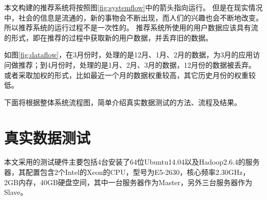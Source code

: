 \begin{center}
\def\sysleft{
    \node at (0,0) [rectangle,draw] {Data from \textbf{Feb}};
    \node at (0,1) [rectangle,draw] {Data from \textbf{Jan}};
    \node at (0,2) [rectangle,draw] {Data from \textbf{Dec}};
    \node at (0,5) [rectangle,draw] {Data from \textbf{Nov}};
    \node at (0,3) [align=center] {\textbf{Data proccessing}\\
             \textbf{in Recommend system}};
    \draw (-2.2,-1) rectangle (2.2,4);
}
\def\sysright{
    \node at (0,0) [rectangle,draw] {Data from \textbf{Mar}};
    \node at (0,1) [rectangle,draw] {Data from \textbf{Feb}};
    \node at (0,2) [rectangle,draw] {Data from \textbf{Jan}};
    \node at (0,5) [rectangle,draw] {Data from \textbf{Dec}};
    \node at (0,3) [align=center] {\textbf{Data proccessing}\\
             \textbf{in Recommend system}};
    \draw (-2.2,-1) rectangle (2.2,4);
}
\label{fig:dataflow}
\end{center}

本文构建的推荐系统将按照图\ref{fig:systemflow}中的箭头指向运行。
但是在现实情况中，社会的信息是流通的，新的事物会不断出现，而人们的兴趣也会不断地改变。
所以推荐系统的运行过程不是一次性的。
推荐系统所使用的用户数据应该具有流的形式，即在推荐的过程中获取新的用户数据，并丢弃旧的数据。

如图\ref{fig:dataflow}，在3月份时，处理的是12月、1月、2月的数据，为3月的应用访问做推荐；到4月份时，处理的是1月、2月、3月的数据，12月份的数据被丢弃。
或者采取加权的形式，比如最近一个月的数据权重较高，其它历史月份的权重较低。

下面将根据整体系统流程图，简单介绍真实数据测试的方法、流程及结果。

\section{真实数据测试}
本文采用的测试硬件主要包括4台安装了64位Ubuntu14.04以及Hadoop2.6.4的服务器，其配置包含2个Intel的Xeon的CPU，型号为E5-2630，核心频率2.30GHz，2GB内存，40GB硬盘空间，其中一台服务器作为Master，另外三台服务器作为Slave。

